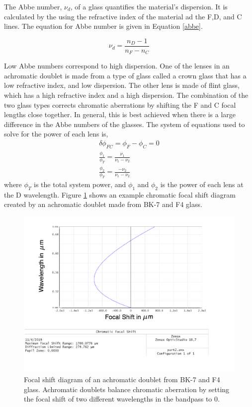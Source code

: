 The Abbe number, $\nu_d$, of a glass quantifies the material's dispersion. It is calculated by the using the refractive index of the material ad the F,D, and C lines. The equation for Abbe number is given in Equation \ref{abbe}. 

\begin{equation}
    \nu_d=\frac{n_D-1}{n_F-n_C}
    \label{abbe}
\end{equation}

Low Abbe numbers correspond to high dispersion. One of the lenses in an achromatic doublet is made from a type of glass called a crown glass that has a low refractive index, and low dispersion. The other lens is made of flint glass, which has a high refractive index and a high dispersion. The combination of the two glass types corrects chromatic aberrations by shifting the F and C focal lengths close together. In general, this is best achieved when there is a large difference in the Abbe numbers of the glasses. The system of equations used to solve for the power of each lens is,
%
\begin{eqnarray}
       \delta \phi_{FC}=\phi_F-\phi_C=0 \\
       \frac{\phi_{1}}{\phi_T}= \frac{\nu_1}{\nu_1-\nu_2} \\
       \frac{\phi_{2}}{\phi_T}= \frac{-\nu_2}{\nu_1-\nu_2}\nonumber
\end{eqnarray}
where $\phi_T$ is the total system power, and $\phi_1$ and $\phi_2$ is the power of each lens at the D wavelength. Figure \ref{fig:doublet} shows an example chromatic focal shift diagram created by an achromatic doublet made from BK-7 and F4 glass. 

\begin{figure}
    \centering
    \includegraphics[width=.8\textwidth]{Chapter Materials/Chapter Three Materials/doubletfocalshift.png}
    \caption{Focal shift diagram of an achromatic doublet from BK-7 and F4 glass. Achromatic doublets balance chromatic aberration by setting the focal shift of two different wavelengths in the bandpass to 0.}
    \label{fig:doublet}
\end{figure}

